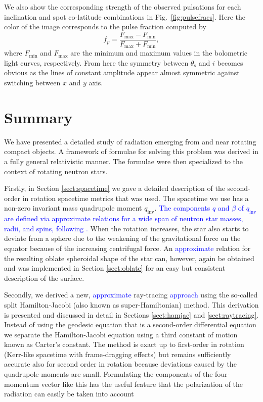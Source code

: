 \documentclass{aa}
\newcommand{\be}{\begin{equation}}
\newcommand{\ee}{\end{equation}}
\newcommand{\refe}[1]{\textcolor{blue}{{#1}}}
\newcommand{\qinv}{\ensuremath{q_{\mathrm{inv}}}}
\begin{document}
We also show the corresponding strength of the observed pulsations for each inclination and spot co-latitude combinations in Fig.~\ref{fig:pulsefracs}.
Here the color of the image corresponds to the pulse fraction computed by
\be
f_p = \frac{F_{\mathrm{max}} - F_{\mathrm{min}}}{F_{\mathrm{max}} + F_{\mathrm{min}}},
\ee
where $F_{\mathrm{min}}$ and $F_{\mathrm{max}}$ are the minimum and maximum values in the bolometric light curves, respectively.
From here the symmetry between $\theta_{\mathrm{s}}$ and $i$ becomes obvious as the lines of constant amplitude appear almost symmetric against switching between $x$ and $y$ axis.




\section{Summary}\label{sect:summary}
We have presented a detailed study of radiation emerging from and near rotating compact objects.
A framework of formulae for solving this problem was derived in a fully general relativistic manner. 
The formulae were then specialized to the context of rotating neutron stars.


Firstly, in Section \ref{sect:spacetime} we gave a detailed description of the second-order in rotation spacetime metrics that was used.
The spacetime we use has a non-zero invariant mass quadrupole moment $\qinv$. 
\refe{The components $q$ and $\beta$ of $\qinv$ are defined via approximate relations for a wide span of neutron star masses, radii, and spins, following \citet{aGM14}.}
When the rotation increases, the star also starts to deviate from a sphere due to the weakening of the gravitational force on the equator because of the increasing centrifugal force.
An \refe{approximate} relation for the resulting oblate spheroidal shape of the star can, however, again be obtained \citep{MLC07, aGM14} and was implemented in Section \ref{sect:oblate} for an easy but consistent description of the surface.

Secondly, we derived a new, \refe{approximate} ray-tracing \refe{approach} using the so-called split Hamilton-Jacobi (also known as super-Hamiltonian) method.
This derivation is presented and discussed in detail in Sections \ref{sect:hamjac} and \ref{sect:raytracing}.
Instead of using the geodesic equation that is a second-order differential equation we separate the Hamilton-Jacobi equation using a third constant of motion known as Carter's constant.
The method is exact up to first-order in rotation (Kerr-like spacetime with frame-dragging effects) but remains sufficiently accurate also for second order in rotation because deviations caused by the quadrupole moments are small.
Formulating the components of the four-momentum vector like this has the useful feature that the polarization of the radiation can easily be taken into account \citep[see e.g.][]{cha, dexter2016}
\end{document}
